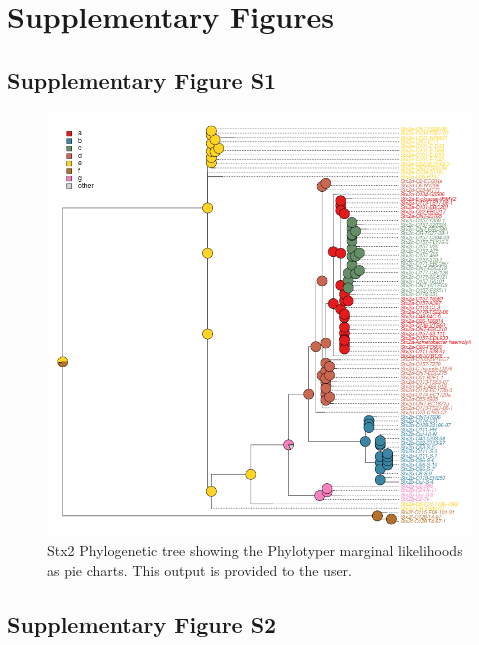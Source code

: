 \documentclass[11pt,letterpaper]{article}
\begin{document}
\section{Supplementary Figures}

\subsection{Supplementary Figure S1}

\begin{figure}[h!]
\centering
\includegraphics[scale=0.5]{sfig01.png}
\caption{Stx2 Phylogenetic tree showing the Phylotyper marginal likelihoods as pie charts. This output is provided to the user.}
\end{figure}

\clearpage

\subsection{Supplementary Figure S2}
\end{document}
